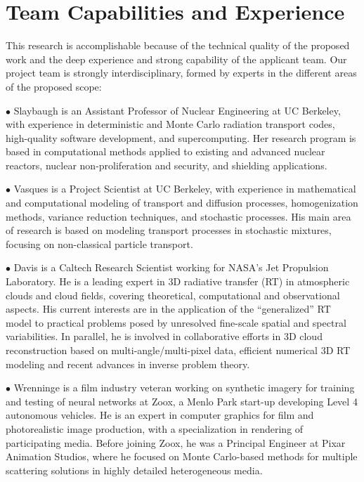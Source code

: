 \documentclass[12pt]{article}
\begin{document}
\section{Team Capabilities and Experience}

This research is accomplishable because of the technical quality of the proposed work and the deep experience and strong capability of the applicant team.
Our project team is strongly interdisciplinary, formed by experts in the different areas of the proposed scope:

$\bullet$ Slaybaugh is an Assistant Professor of Nuclear Engineering at UC Berkeley, with experience in deterministic and Monte Carlo radiation transport codes, high-quality software development, and supercomputing.
Her research program is based in computational methods applied to existing and advanced nuclear reactors, nuclear non-proliferation and security, and shielding applications.

$\bullet$ Vasques is a Project Scientist at UC Berkeley, with experience in mathematical and computational modeling of transport and diffusion processes, homogenization methods, variance reduction techniques, and stochastic processes.
His main area of research is based on modeling transport processes in stochastic mixtures, focusing on non-classical particle transport.

$\bullet$ Davis is a Caltech Research Scientist working for NASA's Jet Propulsion Laboratory.
He is a leading expert in 3D radiative transfer (RT) in atmospheric clouds and cloud fields, covering theoretical, computational and observational aspects.
His current interests are in the application of the ``generalized'' RT model to practical problems posed by unresolved fine-scale spatial and spectral variabilities.
In parallel, he is involved in collaborative efforts in 3D cloud reconstruction based on multi-angle/multi-pixel data, efficient numerical 3D RT modeling and recent advances in inverse problem theory.

$\bullet$ Wrenninge is a film industry veteran working on synthetic imagery for training and testing of neural networks at Zoox, a Menlo Park start-up developing Level 4 autonomous vehicles.
He is an expert in computer graphics for film and photorealistic image production, with a specialization in rendering of participating media.
Before joining Zoox, he was a Principal Engineer at Pixar Animation Studios, where he focused on Monte Carlo-based methods for multiple scattering solutions in highly detailed heterogeneous media.
\end{document}
